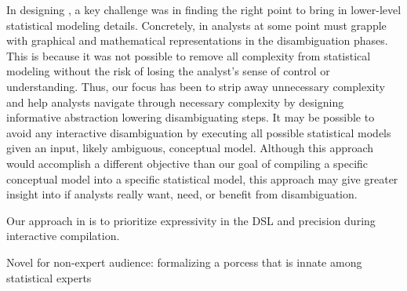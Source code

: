 
In designing \rTisane, a key challenge was in finding the right point to bring
in lower-level statistical modeling details. Concretely, in \rTisane analysts at some point must grapple with graphical and
mathematical representations in the disambiguation phases. This is because it
was not possible to remove all complexity from statistical modeling without the
risk of losing the analyst's sense of control or understanding. Thus, our focus
has been to strip away unnecessary complexity and help analysts navigate through
necessary complexity by designing informative abstraction lowering
disambiguating steps. It may be possible to avoid any interactive disambiguation
by executing all possible statistical models given an input, likely ambiguous,
conceptual model. Although this approach would accomplish a different objective
than our goal of compiling a specific conceptual model into a specific
statistical model, this approach may give greater insight into if analysts
really want, need, or benefit from disambiguation. 

Our approach in \rTisane is to
prioritize expressivity in the DSL and precision during interactive compilation. 


Novel for non-expert audience: formalizing a porcess that is innate among statistical experts


